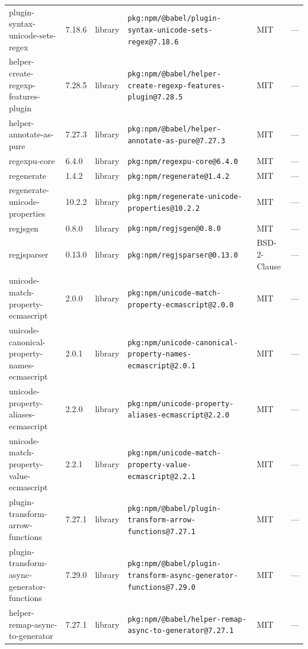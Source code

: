 \documentclass[11pt,a4paper]{article}
\begin{document}
\begin{longtable}{|p{4cm}|p{2cm}|p{1.6cm}|p{5cm}|p{1.5cm}|p{3.5cm}|}
\raggedright plugin-syntax-unicode-sets-regex & 7.18.6 & library & \small\texttt{pkg:npm/@babel/plugin-syntax-unicode-sets-regex@7.18.6} & MIT & \small — \\
\raggedright helper-create-regexp-features-plugin & 7.28.5 & library & \small\texttt{pkg:npm/@babel/helper-create-regexp-features-plugin@7.28.5} & MIT & \small — \\
\raggedright helper-annotate-as-pure & 7.27.3 & library & \small\texttt{pkg:npm/@babel/helper-annotate-as-pure@7.27.3} & MIT & \small — \\
\raggedright regexpu-core & 6.4.0 & library & \small\texttt{pkg:npm/regexpu-core@6.4.0} & MIT & \small — \\
\raggedright regenerate & 1.4.2 & library & \small\texttt{pkg:npm/regenerate@1.4.2} & MIT & \small — \\
\raggedright regenerate-unicode-properties & 10.2.2 & library & \small\texttt{pkg:npm/regenerate-unicode-properties@10.2.2} & MIT & \small — \\
\raggedright regjsgen & 0.8.0 & library & \small\texttt{pkg:npm/regjsgen@0.8.0} & MIT & \small — \\
\raggedright regjsparser & 0.13.0 & library & \small\texttt{pkg:npm/regjsparser@0.13.0} & BSD-2-Clause & \small — \\
\raggedright unicode-match-property-ecmascript & 2.0.0 & library & \small\texttt{pkg:npm/unicode-match-property-ecmascript@2.0.0} & MIT & \small — \\
\raggedright unicode-canonical-property-names-ecmascript & 2.0.1 & library & \small\texttt{pkg:npm/unicode-canonical-property-names-ecmascript@2.0.1} & MIT & \small — \\
\raggedright unicode-property-aliases-ecmascript & 2.2.0 & library & \small\texttt{pkg:npm/unicode-property-aliases-ecmascript@2.2.0} & MIT & \small — \\
\raggedright unicode-match-property-value-ecmascript & 2.2.1 & library & \small\texttt{pkg:npm/unicode-match-property-value-ecmascript@2.2.1} & MIT & \small — \\
\raggedright plugin-transform-arrow-functions & 7.27.1 & library & \small\texttt{pkg:npm/@babel/plugin-transform-arrow-functions@7.27.1} & MIT & \small — \\
\raggedright plugin-transform-async-generator-functions & 7.29.0 & library & \small\texttt{pkg:npm/@babel/plugin-transform-async-generator-functions@7.29.0} & MIT & \small — \\
\raggedright helper-remap-async-to-generator & 7.27.1 & library & \small\texttt{pkg:npm/@babel/helper-remap-async-to-generator@7.27.1} & MIT & \small — \\

\end{longtable}
\end{document}
